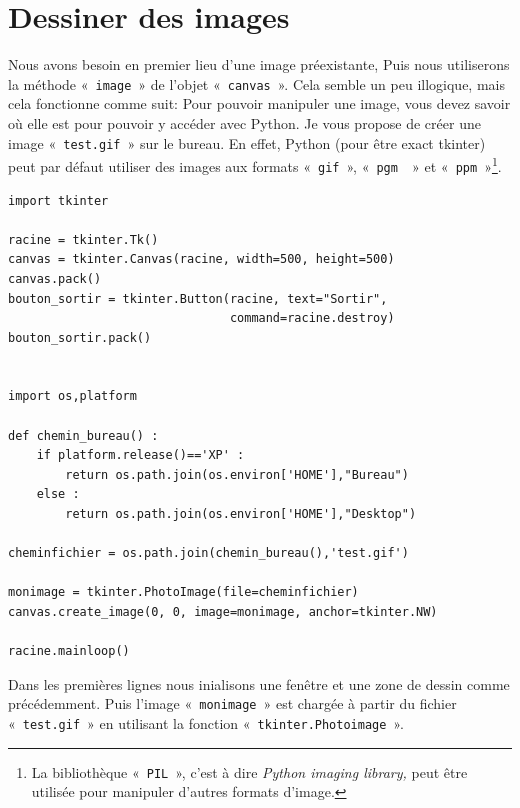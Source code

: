 \section{Dessiner des images}
\label{sec:dessinimages}

Nous avons besoin en premier lieu d'une image préexistante, Puis nous utiliserons la méthode « \texttt{image} » de l'objet « \texttt{canvas} ». Cela semble un peu illogique, mais cela fonctionne comme suit: 
Pour pouvoir manipuler une image, vous devez savoir où elle est pour pouvoir y accéder avec Python. Je vous propose de créer une image « \texttt{test.gif} » sur le bureau. En effet, Python (pour être exact tkinter) peut par défaut utiliser des images aux formats « \texttt{gif} », « \texttt{pgm } » et « \texttt{ppm} »\footnote{La bibliothèque « \texttt{PIL} », c'est à dire \emph{Python imaging library,} peut être utilisée pour manipuler d'autres formats d'image.}.



\begin{Verbatim}[frame=single,rulecolor=\color{mbleu}, label=à taper]
import tkinter

racine = tkinter.Tk()
canvas = tkinter.Canvas(racine, width=500, height=500)
canvas.pack()
bouton_sortir = tkinter.Button(racine, text="Sortir",
                               command=racine.destroy)
bouton_sortir.pack()


import os,platform

def chemin_bureau() :
    if platform.release()=='XP' :
        return os.path.join(os.environ['HOME'],"Bureau")
    else :
        return os.path.join(os.environ['HOME'],"Desktop")
    
cheminfichier = os.path.join(chemin_bureau(),'test.gif')

monimage = tkinter.PhotoImage(file=cheminfichier)
canvas.create_image(0, 0, image=monimage, anchor=tkinter.NW)

racine.mainloop()
\end{Verbatim}

Dans les premières lignes nous inialisons une fenêtre et une zone de dessin comme précédemment.
Puis l'image « \texttt{monimage} » est chargée à partir du fichier « \texttt{test.gif} » en utilisant la fonction « \texttt{tkinter.Photoimage} ».

